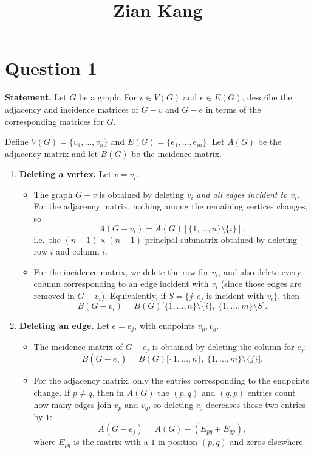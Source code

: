 \documentclass[11pt]{article}
\title{\vspace{-2cm} Zian Kang}
\date{}
\begin{document}
\maketitle



\section*{Question 1}

\textbf{Statement.} Let $G$ be a graph. For $v\in V(G)$ and $e\in E(G)$, describe the adjacency and incidence matrices of $G-v$ and $G-e$ in terms of the corresponding matrices for $G$.

\medskip
\noindent
Define $V(G)=\{v_1,\dots,v_n\}$ and $E(G)=\{e_1,\dots,e_m\}$.
Let $A(G)$ be the adjacency matrix and let $B(G)$ be the incidence matrix.

\begin{enumerate}[label=(\alph*)]
\item \textbf{Deleting a vertex.} Let $v=v_i$.
\begin{itemize}
\item The graph $G-v$ is obtained by deleting $v_i$ \emph{and all edges incident to $v_i$}.
For the adjacency matrix, nothing among the remaining vertices changes, so
\[
A(G-v_i)=A(G)[\{1,\dots,n\}\setminus\{i\}],
\]
i.e.\ the $(n-1)\times(n-1)$ principal submatrix obtained by deleting row $i$ and column $i$.

\item For the incidence matrix, we delete the row for $v_i$, and also delete every column corresponding to an edge incident with $v_i$ (since those edges are removed in $G-v_i$).
Equivalently, if $S=\{j: e_j \text{ is incident with } v_i\}$, then
\[
B(G-v_i)=B(G)\big[\{1,\dots,n\}\setminus\{i\},\ \{1,\dots,m\}\setminus S\big].
\]
\end{itemize}

\item \textbf{Deleting an edge.} Let $e=e_j$, with endpoints $v_p,v_q$.
\begin{itemize}
\item The incidence matrix of $G-e_j$ is obtained by deleting the column for $e_j$:
\[
B(G-e_j)=B(G)\big[ \{1,\dots,n\},\ \{1,\dots,m\}\setminus\{j\}\big].
\]

\item For the adjacency matrix, only the entries corresponding to the endpoints change.
If $p\neq q$, then in $A(G)$ the $(p,q)$ and $(q,p)$ entries count how many edges join $v_p$ and $v_q$, so deleting $e_j$ decreases those two entries by $1$:
\[
A(G-e_j) = A(G) - (E_{pq}+E_{qp}),
\]
where $E_{pq}$ is the matrix with a $1$ in position $(p,q)$ and zeros elsewhere.

\end{itemize}
\end{enumerate}
\end{document}
